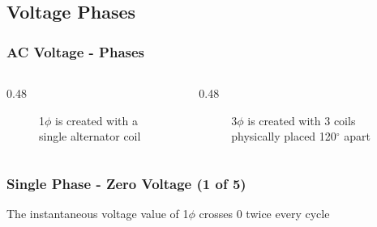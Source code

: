 \subsection{Voltage Phases}

\begin{frame}
    \frametitle{AC Voltage - Phases}

    \begin{columns}
        \begin{column}{0.48\linewidth}
            \begin{figure}
                \centering
                \resizebox{\columnwidth}{!}{
                    
                }

                \vspace{0.5em}
                {\footnotesize 1$\phi$ is created with a single alternator coil\par}
            \end{figure}
        \end{column}
        \begin{column}{0.48\linewidth}
            \begin{figure}
                \centering
                \resizebox{\columnwidth}{!}{
                    
                }

                \vspace{0.5em}
                {\footnotesize 3$\phi$ is created with 3 coils physically placed 120$^\circ$ apart\par}
            \end{figure}
        \end{column}
    \end{columns}
\end{frame}

\begin{frame}
    \frametitle{Single Phase - Zero Voltage (1 of 5)}

        \begin{figure}
            \centering
            \resizebox{0.75\linewidth}{!}{
                
            }
        \end{figure}

        \centering
        \vspace{0.5em}
        {\footnotesize The instantaneous voltage value of 1$\phi$ crosses 0 twice every cycle\par}
\end{frame}

